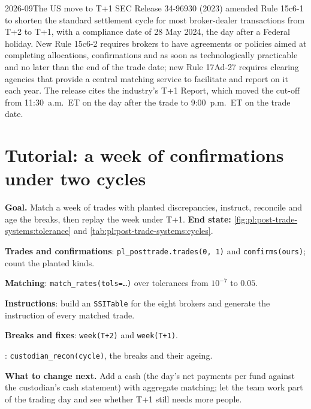 \begin{dated}{2026-09}{The US move to T+1}\label{dat:pl:post-trade-systems:t1}
SEC Release 34-96930 (2023) amended Rule 15c6-1 to shorten the standard settlement cycle for most broker-dealer transactions from T+2 to T+1,
with a compliance date of 28 May 2024, the day after a Federal holiday. New Rule 15c6-2 requires brokers to have agreements or policies aimed
at completing allocations, confirmations and  as soon as technologically practicable and no later than the end of the trade date;
new Rule 17Ad-27 requires clearing agencies that provide a central matching service to facilitate  and report on it
each year. The release cites the industry's T+1 Report, which moved the  cut-off from 11:30~a.m.\ ET on the day after the trade to
9:00~p.m.\ ET on the trade date.
\end{dated}

\section{Tutorial: a week of confirmations under two cycles}\label{tut:pl:post-trade-systems:tut}

\begin{tutorial}
\textbf{Goal.} Match a week of trades with planted discrepancies, instruct, reconcile and age the breaks, then replay the week under T+1.
\textbf{End state:} \cref{fig:pl:post-trade-systems:tolerance} and \cref{tab:pl:post-trade-systems:cycles}.
\begin{tutsteps}
\item \textbf{Trades and confirmations}: \texttt{pl\_posttrade.trades(0, 1)} and \texttt{confirms(ours)}; count the planted kinds.
\item \textbf{Matching}: \texttt{match\_rates(tols=\dots)} over tolerances from $10^{-7}$ to $0.05$.
\item \textbf{Instructions}: build an \texttt{SSITable} for the eight brokers and generate the instruction of every matched trade.
\item \textbf{Breaks and fixes}: \texttt{week(\textquotedbl T+2\textquotedbl)} and \texttt{week(\textquotedbl T+1\textquotedbl)}.
\item \textbf{}: \texttt{custodian\_recon(cycle)}, the breaks and their ageing.
\end{tutsteps}
\textbf{What to change next.} Add a cash  (the day's net payments per fund against the custodian's cash statement) with
aggregate matching; let the team work part of the trading day and see whether T+1 still needs more people.
\end{tutorial}

